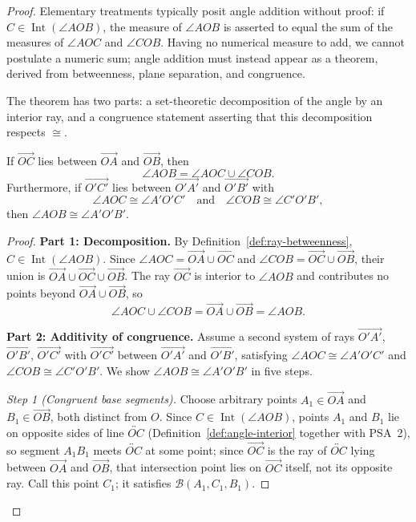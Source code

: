 \documentclass[../../../main/main.tex]{subfiles}
\begin{document}
\begin{proof}
Elementary treatments typically posit angle addition without proof: if $C \in \operatorname{Int}(\angle AOB)$, the measure of $\angle AOB$ is asserted to equal the sum of the measures of $\angle AOC$ and $\angle COB$. Having no numerical measure to add, we cannot postulate a numeric sum; angle addition must instead appear as a theorem, derived from betweenness, plane separation, and congruence.

The theorem has two parts: a set-theoretic decomposition of the angle by an interior ray, and a congruence statement asserting that this decomposition respects $\cong$.

\begin{theorem}\label{thm:angle-addition}
If $\overrightarrow{OC}$ lies between $\overrightarrow{OA}$ and $\overrightarrow{OB}$, then
\[
\angle AOB = \angle AOC \cup \angle COB.
\]
Furthermore, if $\overrightarrow{O'C'}$ lies between $\overrightarrow{O'A'}$ and $\overrightarrow{O'B'}$ with
\[
\angle AOC \cong \angle A'O'C' \quad\text{and}\quad \angle COB \cong \angle C'O'B',
\]
then $\angle AOB \cong \angle A'O'B'$.
\end{theorem}
\begin{proof}
\textbf{Part 1: Decomposition.} By Definition~\ref{def:ray-betweenness}, $C \in \operatorname{Int}(\angle AOB)$. Since $\angle AOC = \overrightarrow{OA} \cup \overrightarrow{OC}$ and $\angle COB = \overrightarrow{OC} \cup \overrightarrow{OB}$, their union is $\overrightarrow{OA} \cup \overrightarrow{OC} \cup \overrightarrow{OB}$. The ray $\overrightarrow{OC}$ is interior to $\angle AOB$ and contributes no points beyond $\overrightarrow{OA} \cup \overrightarrow{OB}$, so
\[
\angle AOC \cup \angle COB = \overrightarrow{OA} \cup \overrightarrow{OB} = \angle AOB.
\]

\textbf{Part 2: Additivity of congruence.} Assume a second system of rays $\overrightarrow{O'A'}$, $\overrightarrow{O'B'}$, $\overrightarrow{O'C'}$ with $\overrightarrow{O'C'}$ between $\overrightarrow{O'A'}$ and $\overrightarrow{O'B'}$, satisfying $\angle AOC \cong \angle A'O'C'$ and $\angle COB \cong \angle C'O'B'$. We show $\angle AOB \cong \angle A'O'B'$ in five steps.

\emph{Step 1 (Congruent base segments).} Choose arbitrary points $A_1 \in \overrightarrow{OA}$ and $B_1 \in \overrightarrow{OB}$, both distinct from $O$. Since $C \in \operatorname{Int}(\angle AOB)$, points $A_1$ and $B_1$ lie on opposite sides of line $\overleftrightarrow{OC}$ (Definition~\ref{def:angle-interior} together with PSA~2), so segment $A_1B_1$ meets $\overleftrightarrow{OC}$ at some point; since $\overrightarrow{OC}$ is the ray of $\overleftrightarrow{OC}$ lying between $\overrightarrow{OA}$ and $\overrightarrow{OB}$, that intersection point lies on $\overrightarrow{OC}$ itself, not its opposite ray. Call this point $C_1$; it satisfies $\mathcal{B}(A_1, C_1, B_1)$.


\end{proof}
\end{proof}
\end{document}
